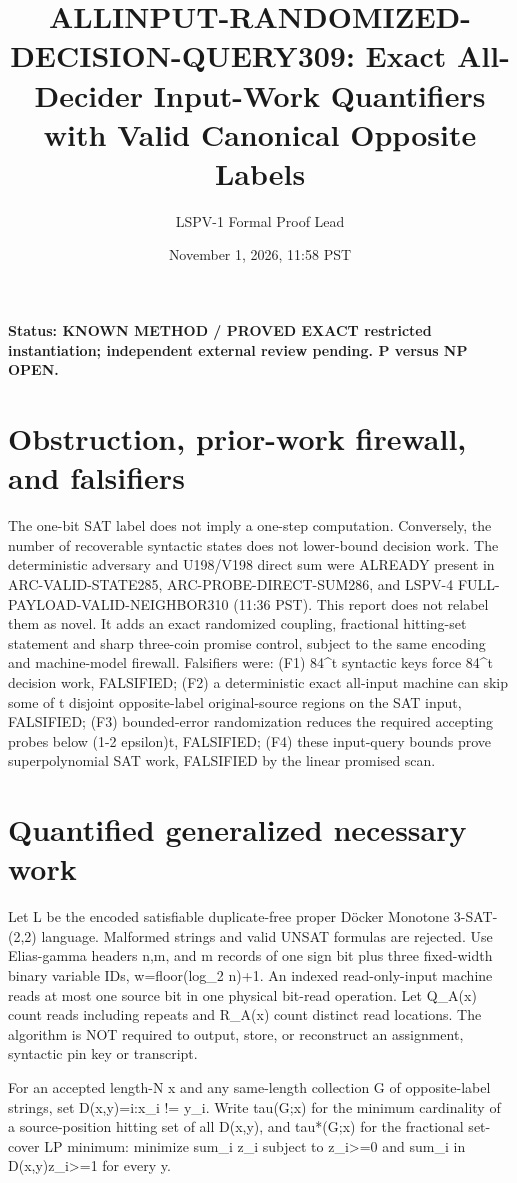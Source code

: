 \documentclass[11pt]{article}
\title{ALLINPUT-RANDOMIZED-DECISION-QUERY309: Exact All-Decider Input-Work Quantifiers with Valid Canonical Opposite Labels}
\author{LSPV-1 Formal Proof Lead}
\date{November 1, 2026, 11:58 PST}
\begin{document}
\maketitle
\noindent\textbf{Status: KNOWN METHOD / PROVED EXACT restricted instantiation; independent external review pending. P versus NP OPEN.}
\section{Obstruction, prior-work firewall, and falsifiers}
The one-bit SAT label does not imply a one-step computation. Conversely, the number of recoverable syntactic states does not lower-bound decision work. The deterministic adversary and U198/V198 direct sum were ALREADY present in ARC-VALID-STATE285, ARC-PROBE-DIRECT-SUM286, and LSPV-4 FULL-PAYLOAD-VALID-NEIGHBOR310 (11:36 PST). This report does not relabel them as novel. It adds an exact randomized coupling, fractional hitting-set statement and sharp three-coin promise control, subject to the same encoding and machine-model firewall. Falsifiers were: (F1) 84^t syntactic keys force 84^t decision work, FALSIFIED; (F2) a deterministic exact all-input machine can skip some of t disjoint opposite-label original-source regions on the SAT input, FALSIFIED; (F3) bounded-error randomization reduces the required accepting probes below (1-2 epsilon)t, FALSIFIED; (F4) these input-query bounds prove superpolynomial SAT work, FALSIFIED by the linear promised scan.

\section{Quantified generalized necessary work}
Let L be the encoded satisfiable duplicate-free proper D\"ocker Monotone 3-SAT-(2,2) language. Malformed strings and valid UNSAT formulas are rejected. Use Elias-gamma headers n,m, and m records of one sign bit plus three fixed-width binary variable IDs, w=floor(log_2 n)+1. An indexed read-only-input machine reads at most one source bit in one physical bit-read operation. Let Q_A(x) count reads including repeats and R_A(x) count distinct read locations. The algorithm is NOT required to output, store, or reconstruct an assignment, syntactic pin key or transcript.

For an accepted length-N x and any same-length collection G of opposite-label strings, set D(x,y)={i:x_i != y_i}. Write tau(G;x) for the minimum cardinality of a source-position hitting set of all D(x,y), and tau*(G;x) for the fractional set-cover LP minimum: minimize sum_i z_i subject to z_i>=0 and sum_{i in D(x,y)}z_i>=1 for every y.
\end{document}
